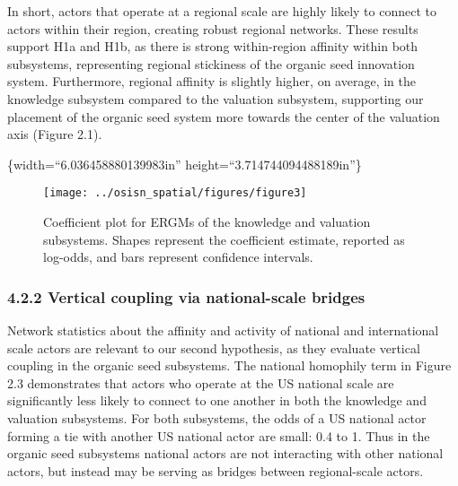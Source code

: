 \documentclass[twoside,12pt,final]{ucthesis-CA2012}
\begin{document}
\begin{ucmainmatter}
In short, actors that operate at a regional scale are highly likely to
connect to actors within their region, creating robust regional
networks. These results support H1a and H1b, as there is strong
within-region affinity within both subsystems, representing regional
stickiness of the organic seed innovation system. Furthermore, regional
affinity is slightly higher, on average, in the knowledge subsystem
compared to the valuation subsystem, supporting our placement of the
organic seed system more towards the center of the valuation axis
(Figure 2.1).

\{width=``6.036458880139983in''
height=``3.714744094488189in''\}
\begin{figure}

{\centering \texttt{[image: ../osisn\_spatial/figures/figure3]} 

}

\caption{Coefficient plot for ERGMs of the knowledge and valuation subsystems. Shapes represent the coefficient estimate, reported as log-odds, and bars represent confidence intervals.}\label{fig:unnamed-chunk-20}
\end{figure}
\hypertarget{vertical-coupling-via-national-scale-bridges}{%
\subsubsection{4.2.2 Vertical coupling via national-scale bridges}\label{vertical-coupling-via-national-scale-bridges}}

Network statistics about the affinity and activity of national and
international scale actors are relevant to our second hypothesis, as
they evaluate vertical coupling in the organic seed subsystems. The
national homophily term in Figure 2.3 demonstrates that actors who
operate at the US national scale are significantly less likely to
connect to one another in both the knowledge and valuation subsystems.
For both subsystems, the odds of a US national actor forming a tie with
another US national actor are small: 0.4 to 1. Thus in the organic seed
subsystems national actors are not interacting with other national
actors, but instead may be serving as bridges between regional-scale
actors.


\end{ucmainmatter}
\end{document}
